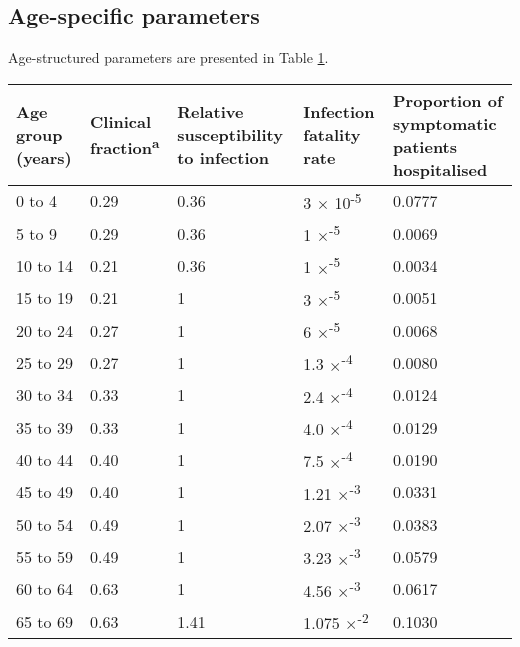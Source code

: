 \subsection{Age-specific parameters}

Age-structured parameters are presented in Table \ref{age_params}.

\begin{table}[ht]
\renewcommand{\baselinestretch}{1}
	\label{age_params}
    \begin{tabular}[ht]{| p{2cm} | p{2.5cm} | p{3cm} | p{3cm} | p{2.5cm}|}
    \hline
        Age group (years) & Clinical fraction\textsuperscript{a} & Relative susceptibility to infection & Infection fatality rate & Proportion of symptomatic patients hospitalised \\
        \hline
        0 to 4 & 0.29 & 0.36 & 3 $\times$ 10\textsuperscript{-5} & 0.0777 \\
        \hline
        5 to 9 & 0.29 & 0.36 & 1 $\times$\textsuperscript{-5} & 0.0069 \\
        \hline
        10 to 14 & 0.21 & 0.36 & 1 $\times$\textsuperscript{-5} & 0.0034 \\
        \hline
        15 to 19 & 0.21 & 1 & 3 $\times$\textsuperscript{-5} & 0.0051 \\
        \hline
        20 to 24 & 0.27 & 1 & 6 $\times$\textsuperscript{-5} & 0.0068 \\
        \hline
        25 to 29 & 0.27 & 1 & 1.3 $\times$\textsuperscript{-4} & 0.0080 \\
        \hline
        30 to 34 & 0.33 & 1 & 2.4 $\times$\textsuperscript{-4} & 0.0124 \\
        \hline
        35 to 39 & 0.33 & 1 & 4.0 $\times$\textsuperscript{-4} & 0.0129 \\
        \hline
        40 to 44 & 0.40 & 1 & 7.5 $\times$\textsuperscript{-4} & 0.0190 \\
        \hline
        45 to 49 & 0.40 & 1 & 1.21 $\times$\textsuperscript{-3} & 0.0331 \\
        \hline
        50 to 54 & 0.49 & 1 & 2.07 $\times$\textsuperscript{-3} & 0.0383 \\
        \hline
        55 to 59 & 0.49 & 1 & 3.23 $\times$\textsuperscript{-3} & 0.0579 \\
        \hline
        60 to 64 & 0.63 & 1 & 4.56 $\times$\textsuperscript{-3} & 0.0617 \\
        \hline
        65 to 69 & 0.63 & 1.41 & 1.075 $\times$\textsuperscript{-2} & 0.1030 \\

\end{tabular}
\end{table}
